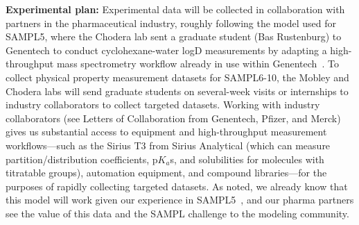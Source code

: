 \documentclass[11pt]{article}
\begin{document}
{\bf Experimental plan:}
Experimental data will be collected in collaboration with partners in the pharmaceutical industry, roughly following the model used for SAMPL5, where the Chodera lab sent a graduate student (Bas Rustenburg) to Genentech to conduct cyclohexane-water logD measurements by adapting a high-throughput mass spectrometry workflow already in use within Genentech~\cite{bas-sampl5-paper}.
To collect physical property measurement datasets for SAMPL6-10, the Mobley and Chodera labs will send graduate students on several-week visits or internships to industry collaborators to collect targeted datasets.
Working with industry collaborators (see Letters of Collaboration from Genentech, Pfizer, and Merck) gives us substantial access to equipment and high-throughput measurement workflows---such as the Sirius T3 from Sirius Analytical (which can measure partition/distribution coefficients, p$K_a$s, and solubilities for molecules with titratable groups), automation equipment, and compound libraries---for the purposes of rapidly collecting targeted datasets.
As noted, we already know that this model will work given our experience in SAMPL5~\cite{rustenburg_measuring_2016}, and our pharma partners see the value of this data and the SAMPL challenge to the modeling community.
\end{document}
